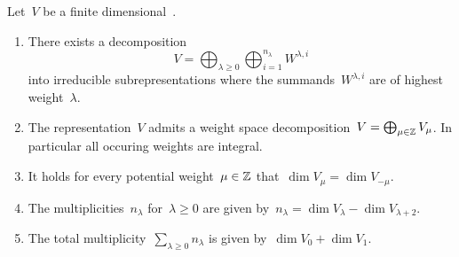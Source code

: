 \begin{theorem}
  \label{finite dimensional representations of sl2}
  Let~$V$ be a finite dimensional~{}.
  \begin{enumerate}
    \item
      There exists a decomposition
      \begin{equation}
        \label{decomposition into irreps}
        V
        =
        \bigoplus_{\lambda \geq 0}
        \bigoplus_{i=1}^{n_\lambda}
        W^{\lambda,i}
      \end{equation}
      into irreducible subrepresentations where the summands~$W^{\lambda,i}$ are of highest weight~$\lambda$.
    \item
      The representation~$V$ admits a weight space decomposition~$V = \bigoplus_{\mu \in \mathbb{Z}} V_\mu$.
      In particular all occuring weights are integral.
    \item
      It holds for every potential weight~$\mu \in \mathbb{Z}$ that~$\dim V_\mu = \dim V_{-\mu}$.
    \item
      \label{calculation of multiplicities}
      The multiplicities~$n_\lambda$ for~$\lambda \geq 0$ are given by~$n_\lambda = \dim V_\lambda - \dim V_{\lambda+2}$.
    \item
      The total multiplicity~$\sum_{\lambda \geq 0} n_\lambda$ is given by~$\dim V_0 + \dim V_1$.
  \end{enumerate}
\end{theorem}


